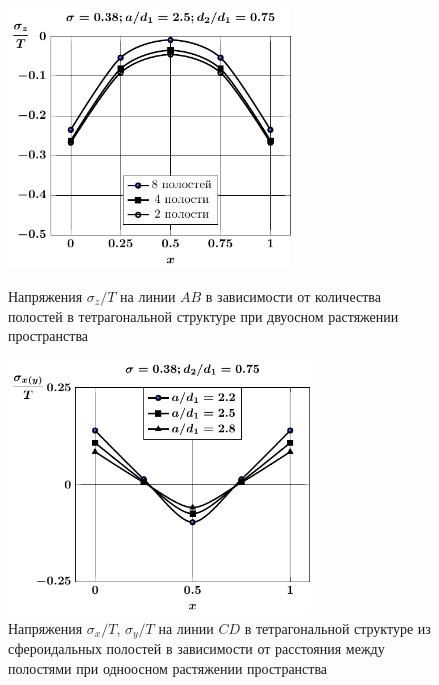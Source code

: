 %

\begin{figure}[h!]
\centering\footnotesize
\parbox[b]{7.5cm}{\centering\includegraphics[width=7.5cm]{cav8-4-2-sig_z-spheroids-tension2.pdf}
\caption{Напряжения $\sigma_z/T$ на линии $AB$ в зависимости от количества полостей в тетрагональной структуре при двуосном растяжении пространства
\label{f:9:13}}}\hfil\hfil
\parbox[b]{7.5cm}{\centering\includegraphics[width=8cm]{cav8-a-d75-t1-sig_x-cd.pdf}
\caption{Напряжения $\sigma_x/T$, $\sigma_y/T$ на линии $CD$ в тетрагональной структуре из сфероидальных полостей в зависимости от расстояния между полостями при одноосном растяжении пространства
\label{f:9:14}}}
\end{figure}

